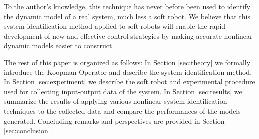 To the author's knowledge, this technique has never before been used to identify the dynamic model of a real system, much less a soft robot.
We believe that this system identification method applied to soft robots will enable the rapid development of new and effective control strategies by making accurate nonlinear dynamic models easier to construct.

The rest of this paper is organized as follows:
In Section \ref{sec:theory} we formally introduce the Koopman Operator and describe the system identification method. 
In Section \ref{sec:experiment} we describe the soft robot and experimental procedure used for collecting input-output data of the system.
In Section \ref{sec:results} we summarize the results of applying various nonlinear system identification techniques to the collected data and compare the performances of the models generated. Concluding remarks and perspectives are provided in Section \ref{sec:conclusion}.

